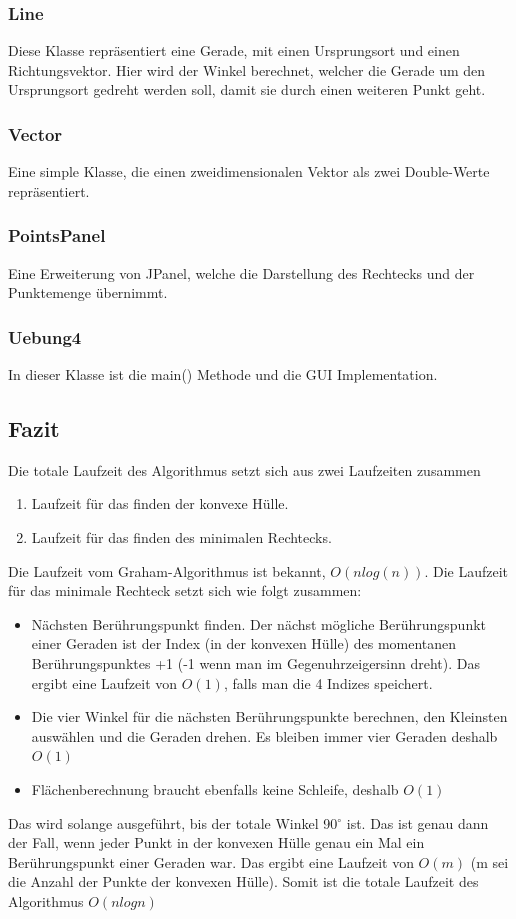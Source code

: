 \documentclass[10pt]{article}
\begin{document}
\subsubsection{Line}
Diese Klasse repräsentiert eine Gerade, mit einen Ursprungsort und einen Richtungsvektor. Hier wird der Winkel berechnet, welcher die Gerade um den Ursprungsort gedreht werden soll, damit sie durch einen weiteren Punkt geht.
\subsubsection{Vector}
Eine simple Klasse, die einen zweidimensionalen Vektor als zwei Double-Werte repräsentiert.

\subsubsection{PointsPanel}
Eine Erweiterung von JPanel, welche die Darstellung des Rechtecks und der Punktemenge übernimmt.

\subsubsection{Uebung4}
In dieser Klasse ist die main() Methode und die GUI Implementation.
\pagebreak
\subsection{Fazit}
Die totale Laufzeit des Algorithmus setzt sich aus zwei Laufzeiten zusammen
\begin{enumerate}
 \item Laufzeit für das finden der konvexe Hülle.
 \item Laufzeit für das finden des minimalen Rechtecks.
\end{enumerate}
Die Laufzeit vom Graham-Algorithmus ist bekannt, $O(n log(n))$. Die Laufzeit für das minimale Rechteck setzt sich wie folgt zusammen:
\begin{itemize}
 \item Nächsten Berührungspunkt finden. Der nächst mögliche Berührungspunkt einer Geraden ist der Index (in der konvexen Hülle) des momentanen Berührungspunktes +1 (-1 wenn man im Gegenuhrzeigersinn dreht). Das ergibt eine Laufzeit von $O(1)$, falls man die 4 Indizes speichert.
 \item Die vier Winkel für die nächsten Berührungspunkte berechnen, den Kleinsten auswählen und die Geraden drehen. Es bleiben immer vier Geraden deshalb $O(1)$
 \item Flächenberechnung braucht ebenfalls keine Schleife, deshalb $O(1)$
\end{itemize}
Das wird solange ausgeführt, bis der totale Winkel 90$^\circ$ ist. Das ist genau dann der Fall, wenn jeder Punkt in der konvexen Hülle genau ein Mal ein Berührungspunkt einer Geraden war. Das ergibt eine Laufzeit von $O(m)$ (m sei die Anzahl der Punkte der konvexen Hülle). Somit ist die totale Laufzeit des Algorithmus $O(n log n)$
\end{document}
